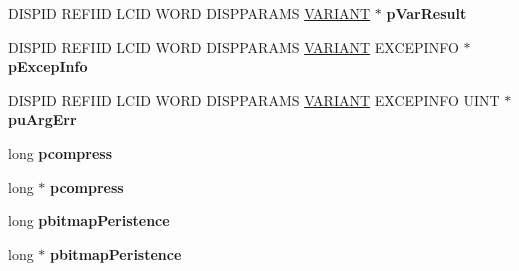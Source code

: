 \begin{DoxyCompactItemize}
\item 
\mbox{\label{struct_m_s_t_s_c_lib_1_1_i_ms_tsc_advanced_settings_vtbl_a6d1f85631c8856d0d8c7232dfcedcc29}} 
D\+I\+S\+P\+ID R\+E\+F\+I\+ID L\+C\+ID W\+O\+RD D\+I\+S\+P\+P\+A\+R\+A\+MS \hyperlink{structtag_v_a_r_i_a_n_t}{V\+A\+R\+I\+A\+NT} $\ast$ {\bfseries p\+Var\+Result}
\item 
\mbox{\label{struct_m_s_t_s_c_lib_1_1_i_ms_tsc_advanced_settings_vtbl_a7f900456c7f4a2926589b08d00739e1e}} 
D\+I\+S\+P\+ID R\+E\+F\+I\+ID L\+C\+ID W\+O\+RD D\+I\+S\+P\+P\+A\+R\+A\+MS \hyperlink{structtag_v_a_r_i_a_n_t}{V\+A\+R\+I\+A\+NT} E\+X\+C\+E\+P\+I\+N\+FO $\ast$ {\bfseries p\+Excep\+Info}
\item 
\mbox{\label{struct_m_s_t_s_c_lib_1_1_i_ms_tsc_advanced_settings_vtbl_a6ac24e1695e356e708ab15c01133fb0d}} 
D\+I\+S\+P\+ID R\+E\+F\+I\+ID L\+C\+ID W\+O\+RD D\+I\+S\+P\+P\+A\+R\+A\+MS \hyperlink{structtag_v_a_r_i_a_n_t}{V\+A\+R\+I\+A\+NT} E\+X\+C\+E\+P\+I\+N\+FO U\+I\+NT $\ast$ {\bfseries pu\+Arg\+Err}
\item 
\mbox{\label{struct_m_s_t_s_c_lib_1_1_i_ms_tsc_advanced_settings_vtbl_af36802ff22c760487b7603bdb775debc}} 
long {\bfseries pcompress}
\item 
\mbox{\label{struct_m_s_t_s_c_lib_1_1_i_ms_tsc_advanced_settings_vtbl_a3ef7a066fa6522dee8eba16dcc87db60}} 
long $\ast$ {\bfseries pcompress}
\item 
\mbox{\label{struct_m_s_t_s_c_lib_1_1_i_ms_tsc_advanced_settings_vtbl_aeee5d151b2c86b4eaaefa15ee5e12ff1}} 
long {\bfseries pbitmap\+Peristence}
\item 
\mbox{\label{struct_m_s_t_s_c_lib_1_1_i_ms_tsc_advanced_settings_vtbl_a6bd57bf37af31284c18dc2d302229d9e}} 
long $\ast$ {\bfseries pbitmap\+Peristence}
\item 
\mbox{\label{struct_m_s_t_s_c_lib_1_1_i_ms_tsc_advanced_settings_vtbl_a5d4f9ee81f59d04aaddcd52674d08ffe}} 

\end{DoxyCompactItemize}
